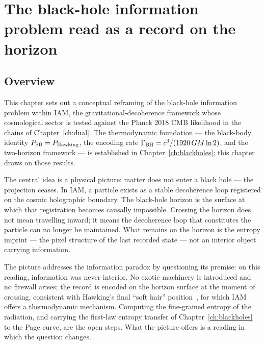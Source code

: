 
\chapter{The black-hole information problem read as a record on the horizon}\label{ch:bhinformation}

\section*{Overview}
This chapter sets out a conceptual reframing of the black-hole information problem within IAM, the gravitational-decoherence framework whose
cosmological sector is tested against the Planck 2018 CMB likelihood in the chains of Chapter~\ref{ch:dual}. The thermodynamic foundation --- the black-body identity
$P_{\rm SB}=P_{\rm Hawking}$, the encoding rate $\Gamma_{\rm BH}=c^3/(1920\,GM\ln2)$, and the two-horizon framework --- is established in
Chapter~\ref{ch:blackholes}; this chapter draws on those results.

The central idea is a physical picture: matter does not enter a black hole --- the projection ceases. In IAM, a particle exists as a stable decoherence loop
registered on the cosmic holographic boundary. The black-hole horizon is the surface at which that registration becomes causally impossible. Crossing the
horizon does not mean travelling inward; it means the decoherence loop that constitutes the particle can no longer be maintained. What remains on the
horizon is the entropy imprint --- the pixel structure of the last recorded state --- not an interior object carrying information. \conjecture

The picture addresses the information paradox by questioning its premise: on this reading, information was never interior. No exotic machinery is
introduced and no firewall arises; the record is encoded on the horizon surface at the moment of crossing, consistent with Hawking's final ``soft hair''
position~\cite{HawkingPerryStrominger2016}, for which IAM offers a thermodynamic mechanism. Computing the fine-grained entropy of the radiation, and carrying the first-law entropy transfer of Chapter~\ref{ch:blackholes} to the Page curve, are the open steps. What the picture offers is a
reading in which the question changes. \interp

